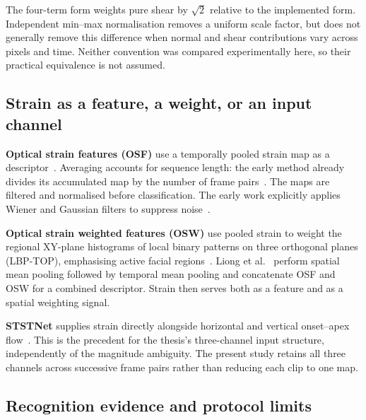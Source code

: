 The four-term form weights pure shear by $\sqrt{2}$ relative to the implemented form. Independent min--max normalisation removes a uniform scale factor, but does not generally remove this difference when normal and shear contributions vary across pixels and time. Neither convention was compared experimentally here, so their practical equivalence is not assumed.

\subsection{Strain as a feature, a weight, or an input channel}
\label{sec:strain-feature-weight}

\textbf{Optical strain features (OSF)} use a temporally pooled strain map as a descriptor~\cite{liong2014a,liong2014b,liong2016}. Averaging accounts for sequence length: the early method already divides its accumulated map by the number of frame pairs~\cite{liong2014a}. The maps are filtered and normalised before classification. The early work explicitly applies Wiener and Gaussian filters to suppress noise~\cite{liong2014a}.

\textbf{Optical strain weighted features (OSW)} use pooled strain to weight the regional XY-plane histograms of local binary patterns on three orthogonal planes (LBP-TOP), emphasising active facial regions~\cite{liong2014b}. Liong et al.~\cite{liong2016} perform spatial mean pooling followed by temporal mean pooling and concatenate OSF and OSW for a combined descriptor. Strain then serves both as a feature and as a spatial weighting signal.

\textbf{STSTNet} supplies strain directly alongside horizontal and vertical onset--apex flow~\cite{liong2019b}. This is the precedent for the thesis's three-channel input structure, independently of the magnitude ambiguity. The present study retains all three channels across successive frame pairs rather than reducing each clip to one map.

\subsection{Recognition evidence and protocol limits}
\label{sec:strain-evidence}

